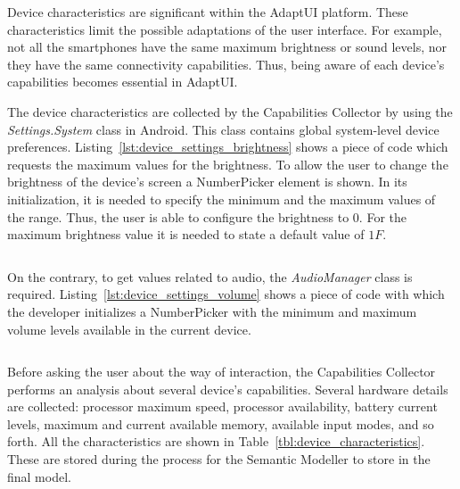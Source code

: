 Device characteristics are significant within the AdaptUI platform. These
characteristics limit the possible adaptations of the user interface. For example,
not all the smartphones have the same maximum brightness or sound levels, nor
they have the same connectivity capabilities. Thus, being aware of each device's
capabilities becomes essential in AdaptUI.

The device characteristics are collected by the Capabilities Collector by using
the \textit{Settings.System} class in Android. This class contains global
system-level device preferences. Listing~\ref{lst:device_settings_brightness} 
shows a piece of code which requests the maximum values for the brightness. To 
allow the user to change the brightness of the device's screen a NumberPicker 
element is shown. In its initialization, it is needed to specify the minimum and 
the maximum values of the range. Thus, the user is able to configure the brightness 
to $0$. For the maximum brightness value it is needed to state a default value 
of $1F$.

\inputminted[linenos=true, fontsize=\footnotesize, frame=lines]{java}{4_system_architecture/device_settings_brightness.java}


On the contrary, to get values related to audio, the \textit{AudioManager} class
is required. Listing~\ref{lst:device_settings_volume} shows a piece of code with
which the developer initializes a NumberPicker with the minimum and maximum
volume levels available in the current device.

\inputminted[linenos=true, fontsize=\footnotesize, frame=lines]{java}{4_system_architecture/device_settings_volume.java}


Before asking the user about the way of interaction, the Capabilities Collector
performs an analysis about several device's capabilities. Several hardware
details are collected: processor maximum speed, processor availability, battery
current levels, maximum and current available memory, available input modes, 
and so forth. All the characteristics are shown in Table~\ref{tbl:device_characteristics}. 
These are stored during the process for the Semantic Modeller to store in the 
final model.

